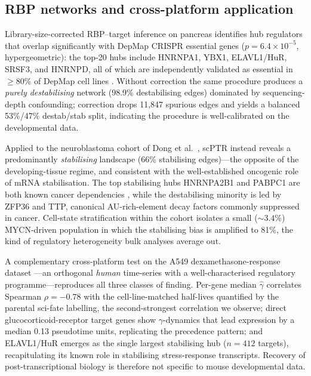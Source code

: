 \documentclass{article}
\begin{document}
\subsection{RBP networks and cross-platform application}
\label{sec:rbp}

Library-size-corrected RBP--target inference on pancreas identifies hub regulators that overlap significantly with DepMap CRISPR essential genes ($p{=}6.4{\times}10^{-5}$, hypergeometric): the top-20 hubs include HNRNPA1, YBX1, ELAVL1/HuR, SRSF3, and HNRNPD, all of which are independently validated as essential in $\geq 80\%$ of DepMap cell lines \cite{dempster2021}. Without correction the same procedure produces a \textit{purely destabilising} network (98.9\% destabilising edges) dominated by sequencing-depth confounding; correction drops 11,847 spurious edges and yields a balanced 53\%/47\% destab/stab split, indicating the procedure is well-calibrated on the developmental data.

Applied to the neuroblastoma cohort of Dong et al.\ \cite{dong2020}, scPTR instead reveals a predominantly \textit{stabilising} landscape (66\% stabilising edges)---the opposite of the developing-tissue regime, and consistent with the well-established oncogenic role of mRNA stabilisation. The top stabilising hubs HNRNPA2B1 and PABPC1 are both known cancer dependencies \cite{dempster2021}, while the destabilising minority is led by ZFP36 and TTP, canonical AU-rich-element decay factors commonly suppressed in cancer. Cell-state stratification within the cohort isolates a small (${\sim}3.4\%$) MYCN-driven population in which the stabilising bias is amplified to 81\%, the kind of regulatory heterogeneity bulk analyses average out.

A complementary cross-platform test on the A549 dexamethasone-response dataset \cite{cao2020}---an orthogonal \textit{human} time-series with a well-characterised regulatory programme---reproduces all three classes of finding. Per-gene median $\widehat{\gamma}$ correlates Spearman $\rho{=}{-}0.78$ with the cell-line-matched half-lives quantified by the parental sci-fate labelling, the second-strongest correlation we observe; direct glucocorticoid-receptor target genes show $\gamma$-dynamics that lead expression by a median 0.13 pseudotime units, replicating the precedence pattern; and ELAVL1/HuR emerges as the single largest stabilising hub ($n{=}412$ targets), recapitulating its known role in stabilising stress-response transcripts. Recovery of post-transcriptional biology is therefore not specific to mouse developmental data.
\end{document}
